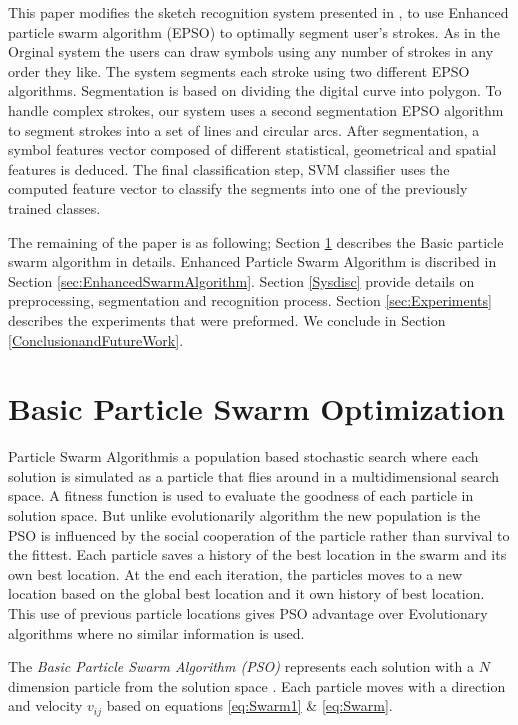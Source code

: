\documentclass[10pt]{article}
\begin{document}
This paper modifies the sketch recognition system presented in \cite{mypaper}, to use Enhanced particle swarm algorithm (EPSO) to optimally segment user's strokes. As in the Orginal system the users can draw symbols using any number of strokes in any order they like. The system segments each stroke using two different EPSO algorithms. Segmentation is based on dividing the digital curve into polygon\cite{PolygonApproximationPSO}. To handle complex strokes, our system uses a second segmentation EPSO algorithm to segment strokes into a set of lines and circular arcs. After segmentation, a symbol features vector composed of different statistical, geometrical and spatial features is deduced. The final classification step, SVM classifier uses the computed feature vector to classify the segments into one of the previously trained classes. 

The remaining of the paper is as following; Section \ref{sec:ParticleSwarmAlgorithm} describes the Basic particle swarm algorithm in details.  Enhanced Particle Swarm Algorithm is discribed in Section \ref{sec:EnhancedSwarmAlgorithm}. Section  \ref{Sysdisc} provide details on preprocessing, segmentation and recognition process. Section \ref{sec:Experiments} describes the experiments that were preformed. We conclude in Section \ref{ConclusionandFutureWork}.
 

\section{Basic Particle Swarm Optimization}
\label{sec:ParticleSwarmAlgorithm}

 Particle Swarm Algorithm\cite{PSOFirst}is a population based stochastic search where each solution is simulated as a  particle that flies around in a multidimensional search space. A fitness function is used to evaluate the goodness of each particle in solution space. But unlike evolutionarily algorithm the new population is the PSO is influenced by the social cooperation of the particle rather than survival to the fittest. Each particle saves a history of the best location in the swarm and its own best location.  At the end each iteration, the particles moves to a new location based on the global best location and it own history of best location. This use of previous particle locations gives PSO advantage over Evolutionary algorithms where no similar information is used.

 The \textit{Basic Particle Swarm Algorithm (PSO)} represents each solution with a $N$ dimension particle from the solution space \cite{PSOFirst}. Each particle moves with a direction and velocity $v_{ij}$ based on equations \ref{eq:Swarm1} \& \ref{eq:Swarm}.
\end{document}
